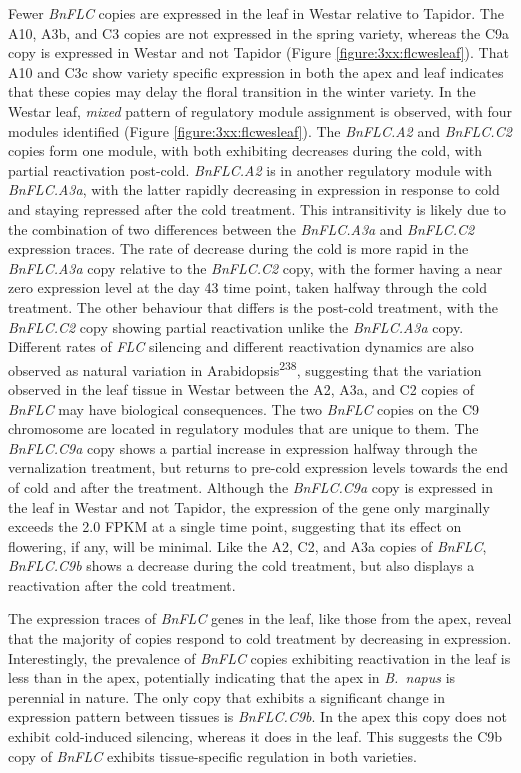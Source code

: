 \documentclass[12pt,]{book}
\begin{document}
Fewer \emph{BnFLC} copies are expressed in the leaf in Westar relative
to Tapidor. The A10, A3b, and C3 copies are not expressed in the spring
variety, whereas the C9a copy is expressed in Westar and not Tapidor
(Figure \ref{figure:3xx:flcwesleaf}). That A10 and C3c show variety
specific expression in both the apex and leaf indicates that these
copies may delay the floral transition in the winter variety. In the
Westar leaf, \emph{mixed} pattern of regulatory module assignment is
observed, with four modules identified (Figure
\ref{figure:3xx:flcwesleaf}). The \emph{BnFLC.A2} and \emph{BnFLC.C2}
copies form one module, with both exhibiting decreases during the cold,
with partial reactivation post-cold. \emph{BnFLC.A2} is in another
regulatory module with \emph{BnFLC.A3a}, with the latter rapidly
decreasing in expression in response to cold and staying repressed after
the cold treatment. This intransitivity is likely due to the combination
of two differences between the \emph{BnFLC.A3a} and \emph{BnFLC.C2}
expression traces. The rate of decrease during the cold is more rapid in
the \emph{BnFLC.A3a} copy relative to the \emph{BnFLC.C2} copy, with the
former having a near zero expression level at the day 43 time point,
taken halfway through the cold treatment. The other behaviour that
differs is the post-cold treatment, with the \emph{BnFLC.C2} copy
showing partial reactivation unlike the \emph{BnFLC.A3a} copy. Different
rates of \emph{FLC} silencing and different reactivation dynamics are
also observed as natural variation in Arabidopsis\textsuperscript{238},
suggesting that the variation observed in the leaf tissue in Westar
between the A2, A3a, and C2 copies of \emph{BnFLC} may have biological
consequences. The two \emph{BnFLC} copies on the C9 chromosome are
located in regulatory modules that are unique to them. The
\emph{BnFLC.C9a} copy shows a partial increase in expression halfway
through the vernalization treatment, but returns to pre-cold expression
levels towards the end of cold and after the treatment. Although the
\emph{BnFLC.C9a} copy is expressed in the leaf in Westar and not
Tapidor, the expression of the gene only marginally exceeds the 2.0 FPKM
at a single time point, suggesting that its effect on flowering, if any,
will be minimal. Like the A2, C2, and A3a copies of \emph{BnFLC},
\emph{BnFLC.C9b} shows a decrease during the cold treatment, but also
displays a reactivation after the cold treatment.

The expression traces of \emph{BnFLC} genes in the leaf, like those from
the apex, reveal that the majority of copies respond to cold treatment
by decreasing in expression. Interestingly, the prevalence of
\emph{BnFLC} copies exhibiting reactivation in the leaf is less than in
the apex, potentially indicating that the apex in \emph{B.~napus} is
perennial in nature. The only copy that exhibits a significant change in
expression pattern between tissues is \emph{BnFLC.C9b}. In the apex this
copy does not exhibit cold-induced silencing, whereas it does in the
leaf. This suggests the C9b copy of \emph{BnFLC} exhibits
tissue-specific regulation in both varieties.
\end{document}
